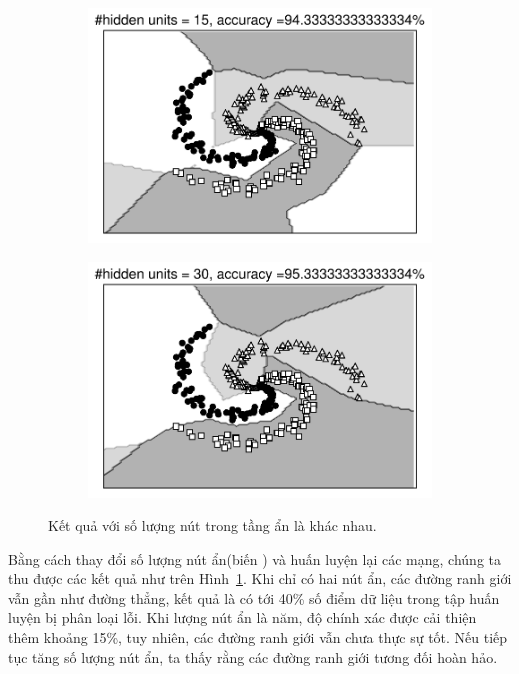 \begin{figure}[t]
    \begin{subfigure}{0.45\textwidth}
    \includegraphics[width=0.99\linewidth]{ebookML_src/src/mlp/ex_res15.pdf}
    \caption{}
    \end{subfigure}
    \begin{subfigure}{0.45\textwidth}
    \includegraphics[width=0.99\linewidth]{ebookML_src/src/mlp/ex_res30.pdf}
    \caption{}
    \end{subfigure}
    \caption{
     Kết quả với số lượng nút trong tầng ẩn là khác nhau.
    }
    \label{fig:14_10}
\end{figure}

Bằng cách thay đổi số lượng nút ẩn(biến ) và huấn luyện lại các
mạng, chúng ta thu được các kết quả như trên Hình~\ref{fig:14_10}. Khi chỉ có
hai nút ẩn, các đường ranh giới vẫn gần như đường thẳng, kết quả là có tới 40\%
số điểm dữ liệu trong tập huấn luyện bị phân loại lỗi. Khi lượng nút ẩn là năm,
độ chính xác được cải thiện thêm khoảng 15\%, tuy nhiên, các đường ranh giới vẫn
chưa thực sự tốt. Nếu tiếp tục tăng số lượng nút ẩn, ta thấy rằng các đường ranh
giới tương đối hoàn hảo.

